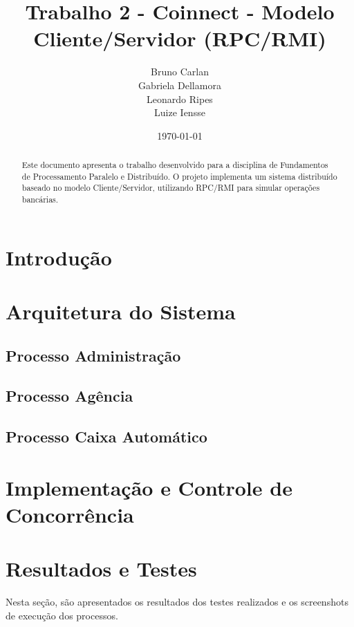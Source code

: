 \documentclass[a4paper,10pt]{article}
\title{Trabalho 2 - Coinnect - Modelo Cliente/Servidor (RPC/RMI)}
\author{Bruno Carlan \\ Gabriela Dellamora \\ Leonardo Ripes \\ Luize Iensse}
\date{\today}
\begin{document}
\maketitle

\begin{abstract}
Este documento apresenta o trabalho desenvolvido para a disciplina de Fundamentos de Processamento Paralelo e Distribuído. O projeto implementa um sistema distribuído baseado no modelo Cliente/Servidor, utilizando RPC/RMI para simular operações bancárias.

\end{abstract}

\begin{multicols}{2}

\section{Introdução}

\section{Arquitetura do Sistema}

\subsection{Processo Administração}

\subsection{Processo Agência}

\subsection{Processo Caixa Automático}

\section{Implementação e Controle de Concorrência}

\end{multicols}

\newpage

\section{Resultados e Testes}
Nesta seção, são apresentados os resultados dos testes realizados e os screenshots de execução dos processos.
\end{document}
